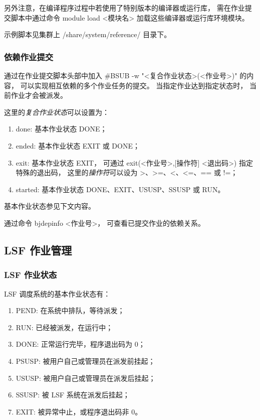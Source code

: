 \documentclass[UTF8]{ctexart}
\newcommand{\mynnote}[1]{\colorbox{gray!15}{\color{blue!65}#1}}
\begin{document}
另外注意，在编译程序过程中若使用了特别版本的编译器或运行库，
需在作业提交脚本中通过命令 \mynnote{module load <模块名>}
加载这些编译器或运行库环境模块。

示例脚本见集群上 /share/system/reference/ 目录下。

\subsubsection{依赖作业提交}
通过在作业提交脚本头部中加入 \mynnote{\#BSUB -w "<复合作业状态>(<作业号>)"} 的内容，
可以实现相互依赖的多个作业任务的提交。
当指定作业达到指定状态时，
当前作业才会被派发。

这里的{\em 复合作业状态}可以设置为：
\begin{enumerate}[\hspace{15mm}（1）]
  \item done: 基本作业状态 DONE；
  \item ended: 基本作业状态 EXIT 或 DONE；
  \item exit: 基本作业状态 EXIT，
    可通过 \mynnote{exit(<作业号>,[操作符] <退出码>)} 指定特殊的退出码，
    这里的{\em 操作符}可以设为 >、>=、<、<=、== 或 !=；
  \item started: 基本作业状态 DONE、EXIT、USUSP、SSUSP 或 RUN。
\end{enumerate}
基本作业状态参见下文内容。

通过命令 \mynnote{bjdepinfo <作业号>}，
可查看已提交作业的依赖关系。

\subsection{LSF 作业管理}
\subsubsection{LSF 作业状态}
LSF 调度系统的基本作业状态有：
\begin{enumerate}[\hspace{15mm}（1）]
  \item PEND: 在系统中排队，等待派发；
  \item RUN: 已经被派发，在运行中；
  \item DONE: 正常运行完毕，程序退出码为 0；
  \item PSUSP: 被用户自己或管理员在派发前挂起；
  \item USUSP: 被用户自己或管理员在派发后挂起；
  \item SSUSP: 被 LSF 系统在派发后挂起；
  \item EXIT: 被异常中止，或程序退出码非 0。
\end{enumerate}
\end{document}
